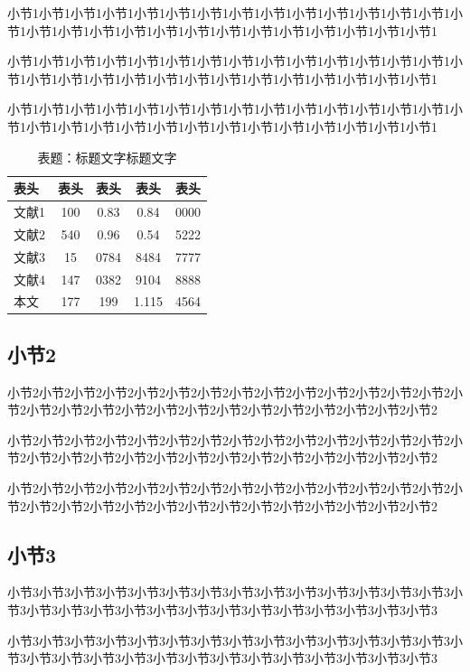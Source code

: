 \documentclass[a4paper, 12pt, oneside]{article}
\theoremstyle{cn_theorem}
\begin{document}
小节1小节1小节1小节1小节1小节1小节1小节1小节1小节1小节1小节1小节1小节1小节1小节1小节1小节1小节1小节1小节1小节1小节1小节1小节1小节1小节1小节1

小节1小节1小节1小节1小节1小节1小节1小节1小节1小节1小节1小节1小节1小节1小节1小节1小节1小节1小节1小节1小节1小节1小节1小节1小节1小节1小节1小节1

小节1小节1小节1小节1小节1小节1小节1小节1小节1小节1小节1小节1小节1小节1小节1小节1小节1小节1小节1小节1小节1小节1小节1小节1小节1小节1小节1小节1

\begin{table}[htbp]
    \centering
    \caption{表题：标题文字标题文字}
    \label{tab:example1}
    \begin{tabular}{l c c c c}
        \toprule
        表头 & 表头 & 表头 & 表头 & 表头 \\
        \midrule
        文献1  & 100 & 0.83 & 0.84 & 0000 \\
        文献2  & 540 & 0.96 & 0.54 & 5222 \\
        文献3  & 15 & 0784 & 8484 & 7777 \\
        文献4  & 147 & 0382 & 9104 & 8888 \\
        本文   & 177 & 199 & 1.115 & 4564 \\
        \bottomrule
    \end{tabular}
\end{table}

\subsection{小节2}
小节2小节2小节2小节2小节2小节2小节2小节2小节2小节2小节2小节2小节2小节2小节2小节2小节2小节2小节2小节2小节2小节2小节2小节2小节2小节2小节2小节2

小节2小节2小节2小节2小节2小节2小节2小节2小节2小节2小节2小节2小节2小节2小节2小节2小节2小节2小节2小节2小节2小节2小节2小节2小节2小节2小节2小节2

小节2小节2小节2小节2小节2小节2小节2小节2小节2小节2小节2小节2小节2小节2小节2小节2小节2小节2小节2小节2小节2小节2小节2小节2小节2小节2小节2小节2


\subsection{小节3}
小节3小节3小节3小节3小节3小节3小节3小节3小节3小节3小节3小节3小节3小节3小节3小节3小节3小节3小节3小节3小节3小节3小节3小节3小节3小节3小节3小节3

小节3小节3小节3小节3小节3小节3小节3小节3小节3小节3小节3小节3小节3小节3小节3小节3小节3小节3小节3小节3小节3小节3小节3小节3小节3小节3小节3小节3
\end{document}
